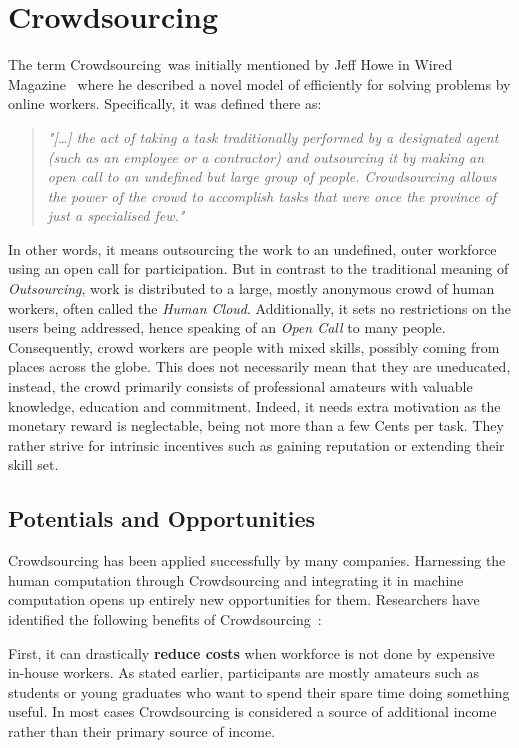 \section{Crowdsourcing}\label{sec:state_of_the_art_crowdsourcing}
The term \guillemotright Crowdsourcing\guillemotleft~was initially mentioned by Jeff Howe in Wired Magazine~\cite{howe2006} where he described a novel model of efficiently for solving problems by online workers. Specifically, it was defined there as:
\begin{quotation}
	\textit{"[\ldots] the act of taking a task traditionally performed by a designated agent (such as an employee or a contractor) and outsourcing it by making an open call to an undefined but large group of people.  Crowdsourcing allows the power of the crowd to accomplish tasks that were once the province of just a specialised few."}\cite{howe2008}
\end{quotation}
In other words, it means outsourcing the work to an undefined, outer workforce using an open call for participation. But in contrast to the traditional meaning of \emph{Outsourcing}, work is distributed to a large, mostly anonymous crowd of human workers, often called the \emph{Human Cloud}. Additionally, it sets no restrictions on the users being addressed, hence speaking of an \emph{Open Call} to many people. Consequently, crowd workers are people with mixed skills, possibly coming from places across the globe. This does not necessarily mean that they are uneducated, instead, the crowd primarily consists of professional amateurs with valuable knowledge, education and commitment. Indeed, it needs extra motivation as the monetary reward is neglectable, being not more than a few Cents per task. They rather strive for intrinsic incentives such as gaining reputation or extending their skill set. 

\subsection{Potentials and Opportunities}
Crowdsourcing has been applied successfully by many companies. Harnessing the human computation through Crowdsourcing and integrating it in machine computation opens up entirely new opportunities for them. Researchers have identified the following benefits of Crowdsourcing~\cite{schenk2012}:

First, it can drastically \textbf{reduce costs} when workforce is not done by expensive in-house workers. As stated earlier, participants are mostly amateurs such as students or young graduates who want to spend their spare time doing something useful. In most cases Crowdsourcing is considered a source of additional income rather than their primary source of income. 

